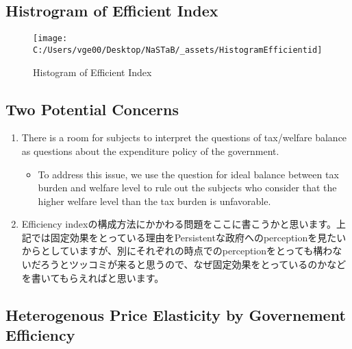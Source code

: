 \documentclass[ review  , 3p ]{elsarticle}
\providecommand{\tightlist}{%
  \setlength{\itemsep}{0pt}\setlength{\parskip}{0pt}}
\begin{document}
  \hypertarget{histrogram-of-efficient-index}{%
  \subsection{Histrogram of Efficient Index}\label{histrogram-of-efficient-index}}
  
  \begin{figure}
  
  {\centering \texttt{[image: C:/Users/vge00/Desktop/NaSTaB/\_assets/HistogramEfficientid]} 
  
  }
  
  \caption{Histogram of Efficient Index}\label{fig:unnamed-chunk-1}
  \end{figure}
  
  \hypertarget{two-potential-concerns}{%
  \subsection{Two Potential Concerns}\label{two-potential-concerns}}
  
  \begin{enumerate}
  \def\labelenumi{\arabic{enumi}.}
  \tightlist
  \item
    There is a room for subjects to interpret the questions of tax/welfare balance as questions about the expenditure policy of the government.
  
    \begin{itemize}
    \tightlist
    \item
      To address this issue, we use the question for ideal balance between tax burden and welfare level to rule out the subjects who consider that the higher welfare level than the tax burden is unfavorable.
    \end{itemize}
  \item
    Efficiency indexの構成方法にかかわる問題をここに書こうかと思います。上記では固定効果をとっている理由をPersistentな政府へのperceptionを見たいからとしていますが、別にそれぞれの時点でのperceptionをとっても構わないだろうとツッコミが来ると思うので、なぜ固定効果をとっているのかなどを書いてもらえればと思います。
  \end{enumerate}
  
  \hypertarget{heterogenous-price-elasticity-by-governement-efficiency}{%
  \subsection{Heterogenous Price Elasticity by Governement Efficiency}\label{heterogenous-price-elasticity-by-governement-efficiency}}
  
\end{document}
